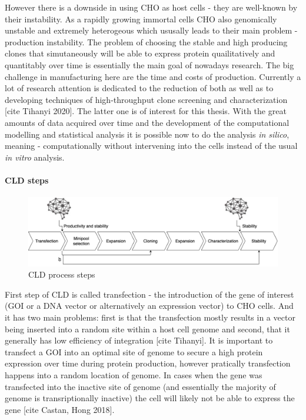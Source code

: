 However there is a downside in using CHO as host cells - they are well-known by their instability. As a rapidly growing immortal cells CHO also genomically unstable and extremely heterogeous which ususally leads to their main problem - production instability. The problem of choosing the stable and high producing clones that simutaneously will be able to express protein quailitatively and quantitably over time is essentially the main goal of nowadays research. The big challenge in manufacturing here are the time and costs of production. Currently a lot of research attention is dedicated to the reduction of both as well as to developing techniques of high-throughput clone screening and characterization [cite Tihanyi 2020]. The latter one is of interest for this thesis. With the great amounts of data acquired over time and the development of the computational modelling and statistical analysis it is possible now to do the analysis \textit{in silico}, meaning - computationally without intervening into the cells instead of the usual \textit{in vitro} analysis.

\paragraph{CLD steps}
\begin{figure}[H]
	\begin{center}
		\includegraphics[width=0.8\linewidth]{bilder/CLD.png}
		\caption{CLD process steps}\label{fig:cls-steps}
	\end{center}
\end{figure}

First step of CLD is called transfection - the introduction of the gene of interest (GOI or a DNA vector or alternatively an expression vector) to CHO cells. And it has two main problems: first is that the transfection mostly results in a vector being inserted into a random site within a host cell genome and second, that it generally has low efficiency of integration [cite Tihanyi]. It is important to transfect a GOI into an optimal site of genome to secure a high protein expression over time during protein production, however pratically transfection happens into a random location of genome. In cases when the gene was transfected into the inactive site of genome (and essentially the majority of genome is transriptionally inactive) the cell will likely not be able to express the gene [cite Castan, Hong 2018].

